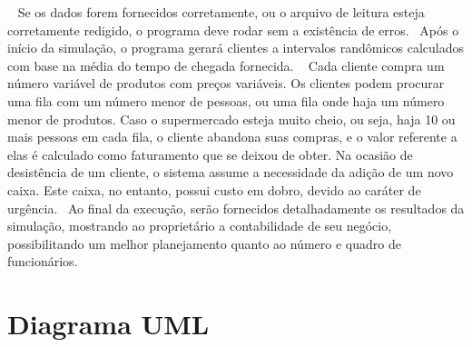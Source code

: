  ~\newline
 Se os dados forem fornecidos corretamente, ou o arquivo de leitura esteja corretamente redigido, o programa deve rodar sem a existência de erros.~\newline
 Após o início da simulação, o programa gerará clientes a intervalos randômicos calculados com base na média do tempo de chegada fornecida. ~\newline
 Cada cliente compra um número variável de produtos com preços variáveis. Os clientes podem procurar uma fila com um número menor de pessoas, ou uma fila onde haja um número menor de produtos. Caso o supermercado esteja muito cheio, ou seja, haja 10 ou mais pessoas em cada fila, o cliente abandona suas compras, e o valor referente a elas é calculado como faturamento que se deixou de obter. Na ocasião de desistência de um cliente, o sistema assume a necessidade da adição de um novo caixa. Este caixa, no entanto, possui custo em dobro, devido ao caráter de urgência.~\newline
 Ao final da execução, serão fornecidos detalhadamente os resultados da simulação, mostrando ao proprietário a contabilidade de seu negócio, possibilitando um melhor planejamento quanto ao número e quadro de funcionários.~\newline
~\newline
~\newline
~\newline
~\newline
\hypertarget{index_diagram}{}\section{Diagrama U\+M\+L}\label{index_diagram}
~\newline
  